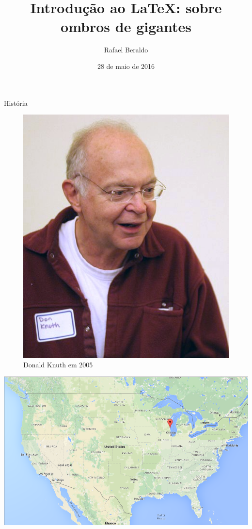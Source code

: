 \documentclass[final]{beamer}
\title{Introdução ao \LaTeX: sobre ombros de gigantes}
\author{Rafael Beraldo}
\date{28 de maio de 2016}
\begin{document}
\maketitle

\begin{frame}[standout]
  \Huge História
\end{frame}

\begin{frame}[plain]
  \begin{figure}[h]
    \includegraphics[scale=.5]{imagens/knuth}
    \caption{Donald Knuth em 2005}
  \end{figure}
\end{frame}

\begin{frame}[plain]
  \hspace*{-11.5mm}
  \begin{centering}
    \includegraphics[width=\pagewidth]{imagens/milwaukee}
  \end{centering}
\end{frame}
\end{document}
